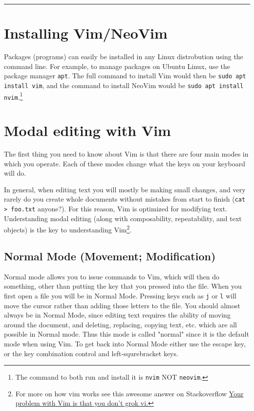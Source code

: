 \documentclass[11pt]{article}
\begin{document}
\noindent\rule{\textwidth}{0.5pt}

\newpage

\section{Installing Vim/NeoVim}
\label{sec:org6a06348}
Packages (programs) can easily be installed in any Linux distrobution using the command line.
For example, to manage packages on Ubuntu Linux, use the package manager \texttt{apt}. The full
command to install Vim would then be \texttt{sudo apt install vim}, and the command to install
NeoVim would be \texttt{sudo apt install nvim}.\footnote{The command to both run and install it is \texttt{nvim} NOT \texttt{neovim}.} 
\section{Modal editing with Vim}
\label{sec:orga5c2913}
The first thing you need to know about Vim is that there are four main modes in
which you operate. Each of these modes change what the keys on your keyboard
will do.

In general, when editing text you will mostly be making small changes, and very
rarely do you create whole documents without mistakes from start to finish (\texttt{cat
> foo.txt} anyone?). For this reason, Vim is optimized for modifying text.
Understanding modal editing (along with composability, repeatability, and text
objects) is the key to understanding Vim\footnote{For more on how vim works see this awesome answer on Stackoverflow
\href{https://stackoverflow.com/questions/1218390/what-is-your-most-productive-shortcut-with-vim}{Your problem with Vim is that you don't grok vi.}}.
\subsection{Normal Mode (Movement; Modification)}
\label{sec:orgcace4b0}
Normal mode allows you to issue commands to Vim, which will then do something,
other than putting the key that you pressed into the file. When you first open a
file you will be in Normal Mode. Pressing keys such as \texttt{j} or \texttt{l} will move the
cursor rather than adding those letters to the file. You should almost always be
in Normal Mode, since editing text requires the ability of moving around the
document, and deleting, replacing, copying text, etc. which are all possible in
Normal mode. Thus this mode is called "normal" since it is the default mode when
using Vim. To get back into Normal Mode either use the escape key, or the key 
combination control and left-squrebracket keys.
\end{document}
